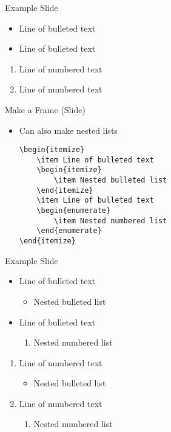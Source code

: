 \begin{frame}[t]{Example Slide}
	\begin{itemize}
		\item Line of bulleted text
		\item Line of bulleted text
	\end{itemize}
	\begin{enumerate}
		\item Line of numbered text
		\item Line of numbered text
	\end{enumerate}
\end{frame}

\begin{frame}[fragile,t]{Make a Frame (Slide)}
	\begin{itemize}
		\item Can also make nested lists
		\begin{lstlisting}
\begin{itemize}
	\item Line of bulleted text
	\begin{itemize}
		\item Nested bulleted list
	\end{itemize}
	\item Line of bulleted text
	\begin{enumerate}
		\item Nested numbered list
	\end{enumerate}
\end{itemize}
		\end{lstlisting}
	\end{itemize}
\end{frame}

\begin{frame}[t]{Example Slide}
	\begin{itemize}
		\item Line of bulleted text
		\begin{itemize}
			\item Nested bulleted list
		\end{itemize}
		\item Line of bulleted text
		\begin{enumerate}
			\item Nested numbered list
		\end{enumerate}
	\end{itemize}
	\begin{enumerate}
		\item Line of numbered text
		\begin{itemize}
			\item Nested bulleted list
		\end{itemize}
		\item Line of numbered text
		\begin{enumerate}
			\item Nested numbered list
		\end{enumerate}
	\end{enumerate}
\end{frame}
